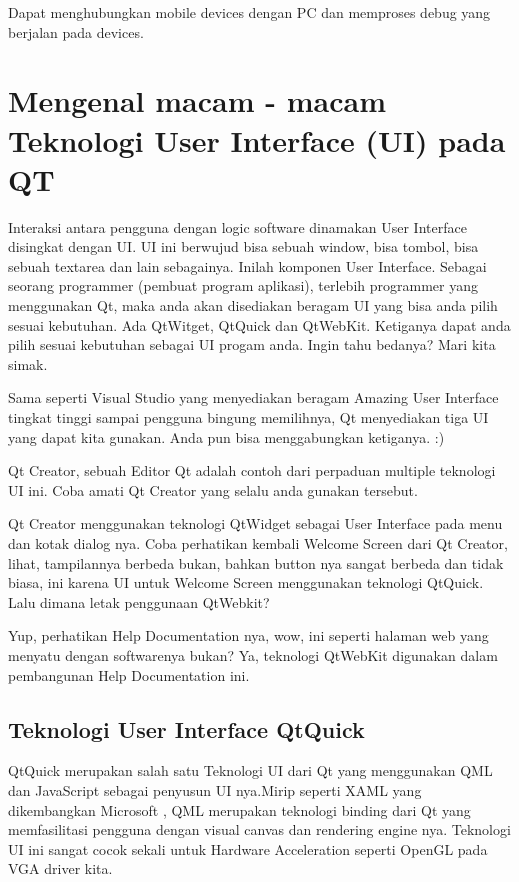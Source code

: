 Dapat menghubungkan mobile devices dengan PC dan memproses debug yang
berjalan pada devices.

\section{Mengenal macam - macam Teknologi User Interface (UI)
pada
QT}\label{mengenal-macam-macam-teknologi-user-interface-ui-pada-qt}

Interaksi antara pengguna dengan logic software dinamakan User Interface
disingkat dengan UI. UI ini berwujud bisa sebuah window, bisa tombol,
bisa sebuah textarea dan lain sebagainya. Inilah komponen User
Interface. Sebagai seorang programmer (pembuat program aplikasi),
terlebih programmer yang menggunakan Qt, maka anda akan disediakan
beragam UI yang bisa anda pilih sesuai kebutuhan. Ada QtWitget, QtQuick
dan QtWebKit. Ketiganya dapat anda pilih sesuai kebutuhan sebagai UI
progam anda. Ingin tahu bedanya? Mari kita simak.

Sama seperti Visual Studio yang menyediakan beragam Amazing User
Interface tingkat tinggi sampai pengguna bingung memilihnya, Qt
menyediakan tiga UI yang dapat kita gunakan. Anda pun bisa menggabungkan
ketiganya. :)

Qt Creator, sebuah Editor Qt adalah contoh dari perpaduan multiple
teknologi UI ini. Coba amati Qt Creator yang selalu anda gunakan
tersebut.

Qt Creator menggunakan teknologi QtWidget sebagai User Interface pada
menu dan kotak dialog nya. Coba perhatikan kembali Welcome Screen dari
Qt Creator, lihat, tampilannya berbeda bukan, bahkan button nya sangat
berbeda dan tidak biasa, ini karena UI untuk Welcome Screen menggunakan
teknologi QtQuick. Lalu dimana letak penggunaan QtWebkit?

Yup, perhatikan Help Documentation nya, wow, ini seperti halaman web
yang menyatu dengan softwarenya bukan? Ya, teknologi QtWebKit digunakan
dalam pembangunan Help Documentation ini.

\subsection{Teknologi User Interface
QtQuick}\label{teknologi-user-interface-qtquick}

QtQuick merupakan salah satu Teknologi UI dari Qt yang menggunakan QML
dan JavaScript sebagai penyusun UI nya.Mirip seperti XAML yang
dikembangkan Microsoft , QML merupakan teknologi binding dari Qt yang
memfasilitasi pengguna dengan visual canvas dan rendering engine nya.
Teknologi UI ini sangat cocok sekali untuk Hardware Acceleration seperti
OpenGL pada VGA driver kita.

